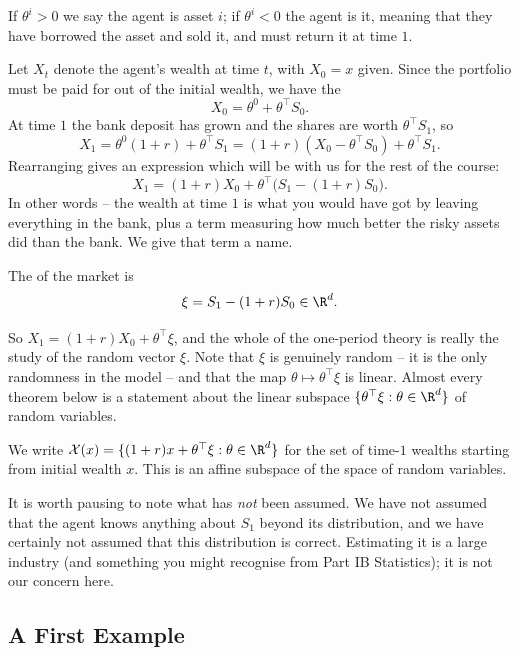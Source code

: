 If $\theta^i > 0$ we say the agent is  asset $i$; if $\theta^i < 0$ the agent is  it, meaning that they have borrowed the asset and sold it, and must return it at time $1$.

Let $X_t$ denote the agent's wealth at time $t$, with $X_0 = x$ given. Since the portfolio must be paid for out of the initial wealth, we have the 
$$
X_0 = \theta^0 + \theta^\top S_0.
$$
At time $1$ the bank deposit has grown and the shares are worth $\theta^\top S_1$, so
$$
X_1 = \theta^0(1+r) + \theta^\top S_1 = (1+r)\left(X_0 - \theta^\top S_0\right) + \theta^\top S_1.
$$
Rearranging gives an expression which will be with us for the rest of the course:
$$
\boxed{\;X_1 = (1+r)X_0 + \theta^\top\big(S_1 - (1+r)S_0\big).\;}
$$
In other words -- the wealth at time $1$ is what you would have got by leaving everything in the bank, plus a term measuring how much better the risky assets did than the bank. We give that term a name.

\begin{definition}
	The  of the market is
	$$
	\xi = S_1 - (1+r)S_0 \in \R^d.
	$$
\end{definition}

So $X_1 = (1+r)X_0 + \theta^\top \xi$, and the whole of the one-period theory is really the study of the random vector $\xi$. Note that $\xi$ is genuinely random -- it is the only randomness in the model -- and that the map $\theta \mapsto \theta^\top \xi$ is linear. Almost every theorem below is a statement about the linear subspace $\{\theta^\top \xi : \theta \in \R^d\}$ of random variables.

We write $\mathcal{X}(x) = \{(1+r)x + \theta^\top \xi : \theta \in \R^d\}$ for the set of  time-$1$ wealths starting from initial wealth $x$. This is an affine subspace of the space of random variables.

\begin{remark}
	It is worth pausing to note what has \emph{not} been assumed. We have not assumed that the agent knows anything about $S_1$ beyond its distribution, and we have certainly not assumed that this distribution is correct. Estimating it is a large industry (and something you might recognise from Part IB Statistics); it is not our concern here.
\end{remark}

\subsection{A First Example}

